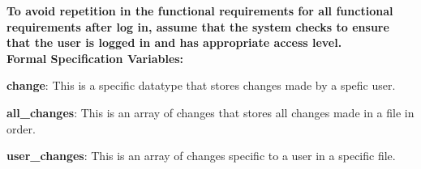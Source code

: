 \documentclass[12pt, titlepage]{article}
\begin{document}
	\textbf{To avoid repetition in the functional requirements for all functional requirements after log in, assume that the system checks to ensure that the user is logged in and has appropriate access level.}\\
	
	\noindent \textbf{Formal Specification Variables:}
	
	\noindent \textbf{change}: This is a specific datatype that stores changes made by a spefic user.
	
	\noindent \textbf{all\_changes}: This is an array of changes that stores all changes made in a file in order.
	
	\noindent \textbf{user\_changes}: This is an array of changes specific to a user in a specific file.\\
	
\end{document}
